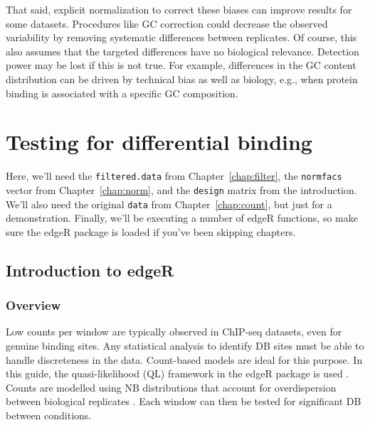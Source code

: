 \documentclass[12pt]{report}
\newcommand{\edger}{edgeR}
\newcommand{\code}[1]{{\small\texttt{#1}}}
\newenvironment{combox}
{ \begin{shaded}\begin{center}\begin{minipage}[t]{0.95\textwidth} }
{ \end{minipage}\end{center}\end{shaded} }
\begin{document}
That said, explicit normalization to correct these biases can improve results for some datasets.
Procedures like GC correction could decrease the observed variability by removing systematic differences between replicates. 
Of course, this also assumes that the targeted differences have no biological relevance.
Detection power may be lost if this is not true. 
For example, differences in the GC content distribution can be driven by technical bias as well as biology, e.g., when protein binding is associated with a specific GC composition.



\chapter{Testing for differential binding}
\label{chap:stats}

\begin{combox}
Here, we'll need the \code{filtered.data} from Chapter~\ref{chap:filter}, the \code{normfacs} vector from Chapter~\ref{chap:norm}, and the \code{design} matrix from the introduction. 
We'll also need the original \code{data} from Chapter~\ref{chap:count}, but just for a demonstration.
Finally, we'll be executing a number of \edger{} functions, so make sure the \edger{} package is loaded if you've been skipping chapters.
\end{combox}

\section{Introduction to \edger{}}

\subsection{Overview}
Low counts per window are typically observed in ChIP-seq datasets, even for genuine binding sites. 
Any statistical analysis to identify DB sites must be able to handle discreteness in the data. 
Count-based models are ideal for this purpose. 
In this guide, the quasi-likelihood (QL) framework in the \edger{} package is used \citep{lund2012}. 
Counts are modelled using NB distributions that account for overdispersion between biological replicates \citep{robinson2008}. 
Each window can then be tested for significant DB between conditions.
\end{document}
